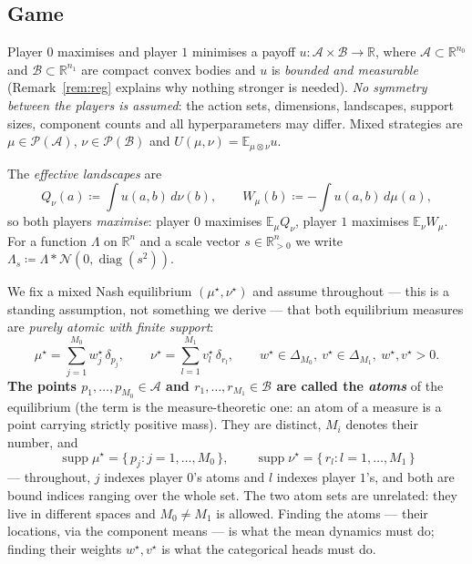 \documentclass[11pt]{article}
\theoremstyle{definition}
\newcommand{\R}{\mathbb{R}}
\newcommand{\E}{\mathbb{E}}
\newcommand{\cA}{\mathcal{A}}
\newcommand{\cB}{\mathcal{B}}
\newcommand{\cP}{\mathcal{P}}
\newcommand{\cN}{\mathcal{N}}
\DeclareMathOperator{\supp}{supp}
\begin{document}
\subsection{Game}

Player $0$ maximises and player $1$ minimises a payoff
$u : \cA \times \cB \to \R$, where $\cA \subset \R^{n_0}$ and
$\cB \subset \R^{n_1}$ are compact convex bodies and $u$ is \emph{bounded and
measurable} (Remark~\ref{rem:reg} explains why nothing stronger is needed).
\emph{No symmetry between the players is assumed}: the action sets,
dimensions, landscapes, support sizes, component counts and all hyperparameters
may differ. Mixed strategies are $\mu \in \cP(\cA)$, $\nu \in \cP(\cB)$ and
$U(\mu,\nu) = \E_{\mu \otimes \nu} u$.

The \emph{effective landscapes} are
\begin{equation}\label{eq:eff}
  Q_\nu(a) \coloneqq \int u(a,b)\,d\nu(b), \qquad
  W_\mu(b) \coloneqq -\int u(a,b)\,d\mu(a),
\end{equation}
so both players \emph{maximise}: player $0$ maximises $\E_\mu Q_\nu$, player $1$
maximises $\E_\nu W_\mu$. For a function $\Lambda$ on $\R^n$ and a scale vector
$s \in \R^n_{>0}$ we write $\Lambda_s \coloneqq \Lambda * \cN(0, \operatorname{diag}(s^2))$.

We fix a mixed Nash equilibrium $(\mu^\star,\nu^\star)$ and assume throughout ---
this is a standing assumption, not something we derive --- that both equilibrium
measures are \emph{purely atomic with finite support}:
\begin{equation}\label{eq:finite}
  \mu^\star = \sum_{j=1}^{M_0} w^\star_j\, \delta_{p_j},
  \qquad
  \nu^\star = \sum_{l=1}^{M_1} v^\star_l\, \delta_{r_l},
  \qquad
  w^\star \in \Delta_{M_0},\ v^\star \in \Delta_{M_1},\ w^\star, v^\star > 0 .
\end{equation}
\textbf{The points $p_1,\dots,p_{M_0} \in \cA$ and $r_1,\dots,r_{M_1} \in \cB$
are called the \emph{atoms}} of the equilibrium (the term is the measure-theoretic
one: an atom of a measure is a point carrying strictly positive mass). They are
distinct, $M_i$ denotes their number, and
\[
  \supp\mu^\star = \{\,p_j : j = 1,\dots,M_0\,\}, \qquad
  \supp\nu^\star = \{\,r_l : l = 1,\dots,M_1\,\}
\]
--- throughout, $j$ indexes player $0$'s atoms and $l$ indexes player $1$'s, and
both are bound indices ranging over the whole set. The two atom sets are
unrelated: they live in different spaces and $M_0 \ne M_1$ is allowed. Finding the atoms --- their
locations, via the component means --- is what the mean dynamics must do; finding
their weights $w^\star, v^\star$ is what the categorical heads must do.
\end{document}
